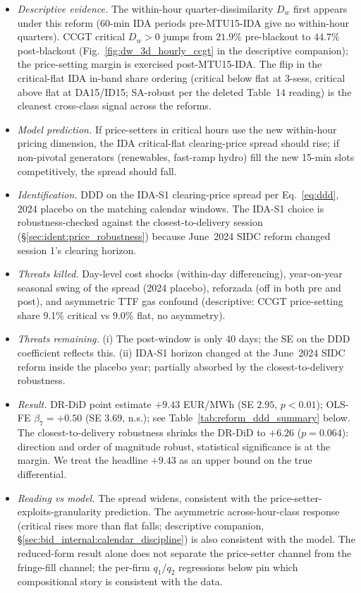 \documentclass[11pt,a4paper]{article}
\begin{document}
\begin{itemize}
\item \emph{Descriptive evidence.} The within-hour quarter-dissimilarity $D_w$ first appears under this reform (60-min IDA periods pre-MTU15-IDA give no within-hour quarters). CCGT critical $D_w > 0$ jumps from $21.9\%$ pre-blackout to $44.7\%$ post-blackout (Fig.~\ref{fig:dw_3d_hourly_ccgt} in the descriptive companion); the price-setting margin is exercised post-MTU15-IDA. The flip in the critical-flat IDA in-band share ordering (critical below flat at 3-sess, critical above flat at DA15/ID15; SA-robust per the deleted Table~14 reading) is the cleanest cross-class signal across the reforms.
\item \emph{Model prediction.} If price-setters in critical hours use the new within-hour pricing dimension, the IDA critical-flat clearing-price spread should rise; if non-pivotal generators (renewables, fast-ramp hydro) fill the new 15-min slots competitively, the spread should fall.
\item \emph{Identification.} DDD on the IDA-S1 clearing-price spread per Eq.~\ref{eq:ddd}, 2024 placebo on the matching calendar windows. The IDA-S1 choice is robustness-checked against the closest-to-delivery session (\S\ref{sec:ident:price_robustness}) because June~2024 SIDC reform changed session 1's clearing horizon.
\item \emph{Threats killed.} Day-level cost shocks (within-day differencing), year-on-year seasonal swing of the spread (2024 placebo), reforzada (off in both pre and post), and asymmetric TTF gas confound (descriptive: CCGT price-setting share 9.1\% critical vs 9.0\% flat, no asymmetry).
\item \emph{Threats remaining.} (i) The post-window is only 40 days; the SE on the DDD coefficient reflects this. (ii) IDA-S1 horizon changed at the June~2024 SIDC reform inside the placebo year; partially absorbed by the closest-to-delivery robustness.
\item \emph{Result.} DR-DiD point estimate $+9.43$ EUR/MWh (SE $2.95$, $p < 0.01$); OLS-FE $\beta_7 = +0.50$ (SE $3.69$, n.s.); see Table~\ref{tab:reform_ddd_summary} below. The closest-to-delivery robustness shrinks the DR-DiD to $+6.26$ ($p = 0.064$): direction and order of magnitude robust, statistical significance is at the margin. We treat the headline $+9.43$ as an upper bound on the true differential.
\item \emph{Reading vs model.} The spread widens, consistent with the price-setter-exploits-granularity prediction. The asymmetric across-hour-class response (critical rises more than flat falls; descriptive companion, \S\ref{sec:bid_internal:calendar_discipline}) is also consistent with the model. The reduced-form result alone does not separate the price-setter channel from the fringe-fill channel; the per-firm $q_1$/$q_2$ regressions below pin which compositional story is consistent with the data.
\end{itemize}
\end{document}
